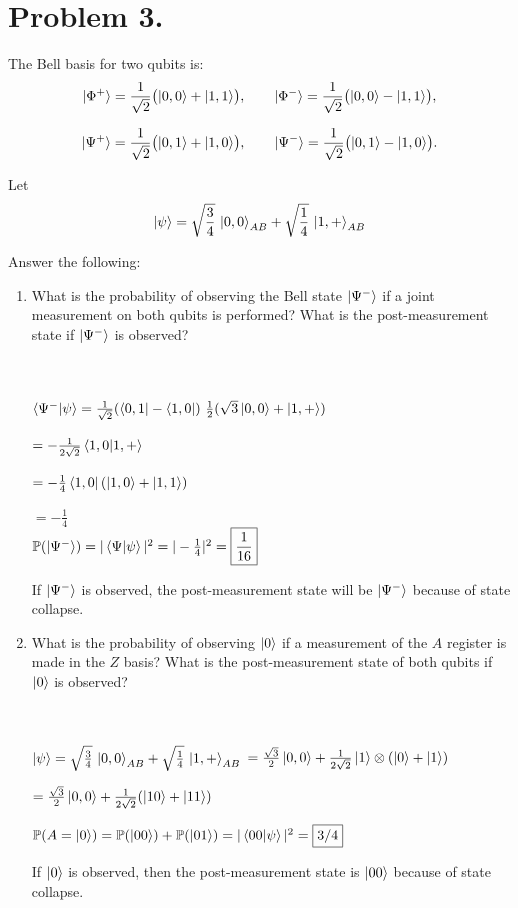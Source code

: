 \documentclass[12pt]{exam}
\begin{document}
\section{Problem 3.}
The Bell basis for two qubits is:
$$\ket{\Phi^{+}}=\frac{1}{\sqrt{2}}\bigl(\ket{0,0}+\ket{1,1}\bigr),\qquad
\ket{\Phi^{-}}=\frac{1}{\sqrt{2}}\bigl(\ket{0,0}-\ket{1,1}\bigr),$$

$$\ket{\Psi^{+}}=\frac{1}{\sqrt{2}}\bigl(\ket{0,1}+\ket{1,0}\bigr),\qquad
\ket{\Psi^{-}}=\frac{1}{\sqrt{2}}\bigl(\ket{0,1}-\ket{1,0}\bigr).$$

Let $$\ket{\psi}=\sqrt{\frac{3}{4}}\,\ket{0,0}_{AB} + \sqrt{\frac{1}{4}}\,\ket{1,+}_{AB}$$

Answer the following:
\begin{enumerate}
    \item[(a)] What is the probability of observing the Bell state $\ket{\Psi^-}$ if a joint measurement on both qubits is performed? What is the post-measurement state if $\ket{\Psi^-}$ is observed?
    \begin{solution}\\\\
        $\braket{\Psi^- | \psi} = \frac{1}{\sqrt{2}} (\bra{0,1} - \bra{1,0}) \ \frac{1}{2} (\sqrt{3} \ket{0,0} + \ket{1,+})$

        $= -\frac{1}{2\sqrt{2}} \braket{1,0 | 1,+}$

        $= -\frac{1}{4} \bra{1,0} (\ket{1,0} + \ket{1,1})$

        $= -\frac{1}{4}$ \\


        $\mathbb{P}(\ket{\Psi^-}) = | \braket{\Psi | \psi} |^2 = |-\frac{1}{4}|^2 = \boxed{\frac{1}{16}}$

        If $\ket{\Psi^-}$ is observed, the post-measurement state will be $\ket{\Psi^-}$ because of state collapse.
    \end{solution}

    \item[(b)] What is the probability of observing $\ket{0}$ if a measurement of the $A$ register is made in the $Z$ basis? What is the post-measurement state of both qubits if $\ket{0}$ is observed?
    \begin{solution}\\\\
    $\ket{\psi}=\sqrt{\frac{3}{4}}\,\ket{0,0}_{AB} + \sqrt{\frac{1}{4}}\,\ket{1,+}_{AB}$
    $=\frac{\sqrt{3}}{2} \ket{0,0} + \frac{1}{2\sqrt{2}} \ket{1} \otimes (\ket{0} + \ket{1})$

    $=\frac{\sqrt{3}}{2} \ket{0,0} + \frac{1}{2\sqrt{2}} (\ket{10} + \ket{11})$

    $\mathbb{P}(A = \ket{0}) = \mathbb{P}(\ket{00}) + \mathbb{P}(\ket{01})= |\braket{00 | \psi}|^2 = \boxed{3/4}$

    If $\ket{0}$ is observed, then the post-measurement state is $\ket{00}$ because of state collapse.
    \end{solution}
\end{enumerate}
\end{document}
